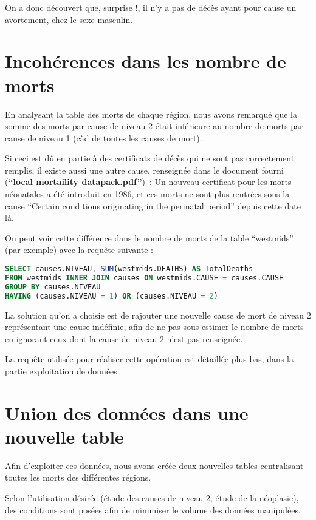     On a donc découvert que, surprise !, il n'y a pas de décès ayant pour cause un avortement, chez le sexe masculin.

\section{Incohérences dans les nombre de morts}

    En analysant la table des morts de chaque région, nous avons remarqué que la somme des morts par cause de niveau 2 était
    inférieure au nombre de morts par cause de niveau 1 (càd de toutes les causes de mort).

    Si ceci est dû en partie à des certificats de décès qui ne sont pas correctement remplis, il existe aussi une autre cause,
    renseignée dans le document fourni (\textbf{``local mortaility datapack.pdf''})~: Un nouveau certificat pour les morts néonatales
    a été introduit en 1986, et ces morts ne sont plus rentrées sous la cause ``Certain conditions originating in the perinatal
    period'' depuis cette date là.

    On peut voir cette différence dans le nombre de morts de la table ``westmids'' (par exemple) avec la requête suivante :

    \begin{lstlisting}[frame=single, language=SQL]
SELECT causes.NIVEAU, SUM(westmids.DEATHS) AS TotalDeaths
FROM westmids INNER JOIN causes ON westmids.CAUSE = causes.CAUSE
GROUP BY causes.NIVEAU
HAVING (causes.NIVEAU = 1) OR (causes.NIVEAU = 2)
    \end{lstlisting}

    La solution qu'on a choisie est de rajouter une nouvelle cause de mort de niveau 2 représentant une cause indéfinie, afin
    de ne pas sous-estimer le nombre de morts en ignorant ceux dont la cause de niveau 2 n'est pas renseignée.

    La requête utilisée pour réaliser cette opération est détaillée plus bas, dans la partie exploitation de données.

\section{Union des données dans une nouvelle table}

    Afin d'exploiter ces données, nous avons créée deux nouvelles tables centralisant toutes les morts des différentes régions.

    Selon l'utilisation désirée (étude des causes de niveau 2, étude de la néoplasie), des conditions sont posées afin
    de minimiser le volume des données manipulées.

